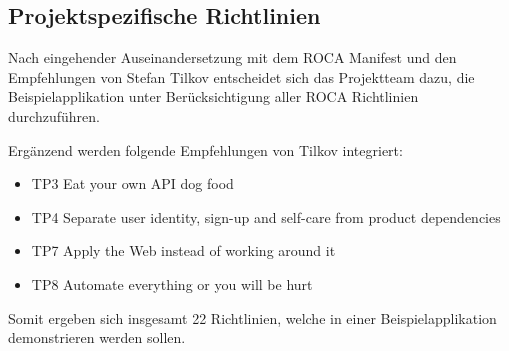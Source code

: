 \subsection{Projektspezifische Richtlinien}
\label{sec:task-analysis-principles}

Nach eingehender Auseinandersetzung mit dem ROCA Manifest und den Empfehlungen von Stefan Tilkov entscheidet sich das Projektteam dazu, die Beispielapplikation unter Berücksichtigung aller ROCA Richtlinien durchzuführen.

Ergänzend werden folgende Empfehlungen von Tilkov integriert:

\begin{itemize}
	\item TP3 Eat your own API dog food
	\item TP4 Separate user identity, sign-up and self-care from product dependencies
	\item TP7 Apply the Web instead of working around it
	\item TP8 Automate everything or you will be hurt
\end{itemize}

Somit ergeben sich insgesamt 22 Richtlinien, welche in einer Beispielapplikation demonstrieren werden sollen.
